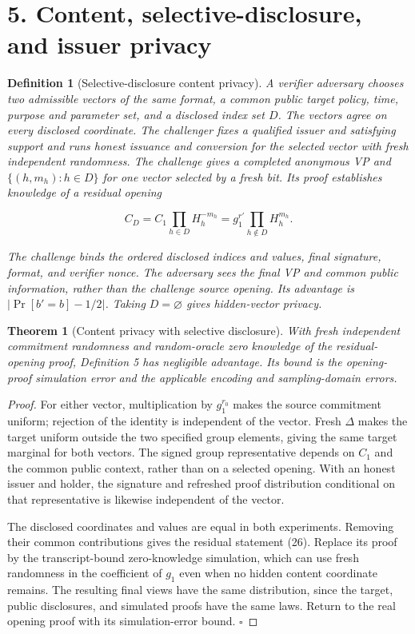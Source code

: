 \documentclass[11pt]{article}
\newtheorem{definition}{Definition}
\newtheorem{theorem}{Theorem}
\begin{document}
\section*{5. Content, selective-disclosure, and issuer privacy}


\begin{definition}[Selective-disclosure content privacy]
A verifier adversary chooses two admissible vectors of the same format, a common public target policy, time, purpose and parameter set, and a disclosed index set \(D\). The vectors agree on every disclosed coordinate. The challenger fixes a qualified issuer and satisfying support and runs honest issuance and conversion for the selected vector with fresh independent randomness. The challenge gives a completed anonymous VP and \(\{(h,m_h):h\in D\}\) for one vector selected by a fresh bit. Its proof establishes knowledge of a residual opening

\[
C_D=C_1\prod_{h\in D}H_h^{-m_h}
=g_1^{r'}\prod_{h\notin D}H_h^{m_h}.
\tag{26}
\]

The challenge binds the ordered disclosed indices and values, final signature, format, and verifier nonce. The adversary sees the final VP and common public information, rather than the challenge source opening. Its advantage is \(\left|\Pr[b'=b]-1/2\right|\). Taking \(D=\varnothing\) gives hidden-vector privacy.

\end{definition}
\begin{theorem}[Content privacy with selective disclosure]
With fresh independent commitment randomness and random-oracle zero knowledge of the residual-opening proof, Definition 5 has negligible advantage. Its bound is the opening-proof simulation error and the applicable encoding and sampling-domain errors.

\end{theorem}
\begin{proof}
For either vector, multiplication by \(g_1^{r_0}\) makes the source commitment uniform; rejection of the identity is independent of the vector. Fresh \(\Delta\) makes the target uniform outside the two specified group elements, giving the same target marginal for both vectors. The signed group representative depends on \(C_1\) and the common public context, rather than on a selected opening. With an honest issuer and holder, the signature and refreshed proof distribution conditional on that representative is likewise independent of the vector.

The disclosed coordinates and values are equal in both experiments. Removing their common contributions gives the residual statement (26). Replace its proof by the transcript-bound zero-knowledge simulation, which can use fresh randomness in the coefficient of \(g_1\) even when no hidden content coordinate remains. The resulting final views have the same distribution, since the target, public disclosures, and simulated proofs have the same laws. Return to the real opening proof with its simulation-error bound. \(\square\)

\end{proof}
\end{document}
